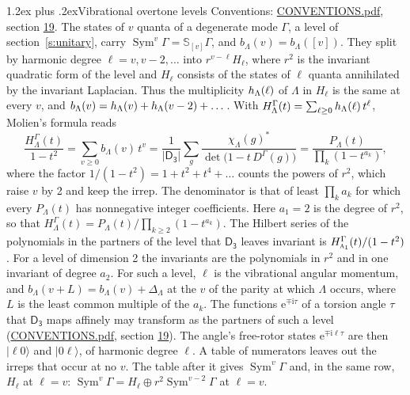 \documentclass[10pt,a4paper]{article}
\makeatletter
\renewcommand\section{\@startsection{section}{1}{\z@}{-3ex plus -1ex minus -.2ex}%
  {1.2ex plus .2ex}{\normalfont\large\sffamily\bfseries\color{parttitle}}}
\numberwithin{equation}{section}
\newcommand{\grp}[1]{\mathsf{#1}}
\newcommand{\irr}[1]{\text{\normalfont\scshape #1}}
\newcommand{\iunit}{\mathrm{i}}
\newcommand{\expe}{\mathrm{e}}
\newcommand{\repD}[1]{D^{#1}}
\newcommand{\irchar}[1]{\chi_{#1}}
\newcommand{\conj}[1]{{#1}^{*}}
\newcommand{\schur}[1]{\mathbb{S}_{#1}}
\newcommand{\shape}[1]{[#1]}
\newcommand{\occ}[1]{\lvert #1\rangle}
\makeatother
\begin{document}
\section{Vibrational overtone levels}\label{s:overtones}
Conventions: \href{../../CONVENTIONS.pdf}{CONVENTIONS.pdf}, section \href{../../CONVENTIONS.pdf\#conv.19}{19}.
\leavevmode\label{n:index.quanta}\label{n:operator.symmetric.power}The states of $v$ quanta of a degenerate mode $\Gamma$, a level of section~\ref{s:unitary}, carry $\operatorname{Sym}^{v}\Gamma = \schur{\shape{v}}\Gamma$, and $b_\Lambda(v) = b_\Lambda(\shape{v})$. \label{n:local.quadratic.form}\label{n:set.harmonic}They split by harmonic degree $\ell = v, v - 2, \dots$ into $r^{v-\ell}H_\ell$, where $r^2$ is the invariant quadratic form of the level and $H_\ell$ consists of the states of $\ell$ quanta annihilated by the invariant Laplacian. \label{n:function.multiplicity.harmonic}Thus the multiplicity $\mathnormal{h}_\Lambda(\ell)$ of $\Lambda$ in $H_\ell$ is the same at every $v$, and $b_\Lambda(v) = \mathnormal{h}_\Lambda(v) + \mathnormal{h}_\Lambda(v - 2) + \dots$. \label{n:function.generating.level}With $H^{\Gamma}_\Lambda(t) = \sum_{\ell\ge0} \mathnormal{h}_\Lambda(\ell)\,t^{\ell}$, Molien's formula reads
\begin{equation}\label{e:molien}\frac{H^{\Gamma}_\Lambda(t)}{1 - t^2} = \sum_{v\ge0} b_\Lambda(v)\,t^v = \frac{1}{|\grp{D_{3}}|}\sum_{g}\frac{\conj{\irchar{\Lambda}(g)}}{\det\bigl(1 - t\,\repD{\Gamma}(g)\bigr)} = \frac{P_\Lambda(t)}{\prod_k (1-t^{a_k})},\end{equation}
where the factor $1/(1 - t^2) = 1 + t^2 + t^4 + \dots$ counts the powers of $r^2$, which raise $v$ by 2 and keep the irrep. The denominator is that of least $\prod_k a_k$ for which every $P_\Lambda(t)$ has nonnegative integer coefficients. Here $a_1 = 2$ is the degree of $r^2$, so that $H^{\Gamma}_\Lambda(t) = P_\Lambda(t)/\prod_{k\ge2}(1 - t^{a_k})$. The Hilbert series of the polynomials in the partners of the level that $\grp{D_{3}}$ leaves invariant is $H^{\Gamma}_{\irr{a}_{1}}(t)/(1 - t^2)$. For a level of dimension 2 the invariants are the polynomials in $r^2$ and in one invariant of degree $a_2$. \label{n:index.overtone.period}\label{n:index.increment.unitary}For such a level, $\ell$ is the vibrational angular momentum, and $b_\Lambda(v + L) = b_\Lambda(v) + \Delta_\Lambda$ at the $v$ of the parity at which $\Lambda$ occurs, where $L$ is the least common multiple of the $a_k$. \label{n:local.torsion.angle}The functions $\expe^{\mp\iunit\tau}$ of a torsion angle $\tau$ that $\grp{D_{3}}$ maps affinely may transform as the partners of such a level (\href{../../CONVENTIONS.pdf}{CONVENTIONS.pdf}, section \href{../../CONVENTIONS.pdf\#conv.19}{19}). The angle's free-rotor states $\expe^{\mp\iunit\ell\tau}$ are then $\occ{\ell 0}$ and $\occ{0 \ell}$, of harmonic degree $\ell$. A table of numerators leaves out the irreps that occur at no $v$. The table after it gives $\operatorname{Sym}^{v}\Gamma$ and, in the same row, $H_\ell$ at $\ell = v$: $\operatorname{Sym}^{v}\Gamma = H_\ell \oplus r^2\operatorname{Sym}^{v-2}\Gamma$ at $\ell = v$.
\end{document}
